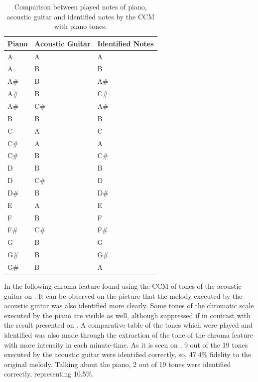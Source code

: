 \documentclass{article}
\begin{document}
	\begin{table}[h!]
	 \begin{center}
	 \begin{tabular}{|l|l|l|}
	  \hline
	  Piano & Acoustic Guitar & Identified Notes \\
	  \hline
		A	& A	& A \\
		A	&    B	&    B \\
		A\#	&    B	&    A\# \\
		A\#	&    B	&    C\# \\
		A\#	&    C\#	&    A\# \\
		B	&    B	&    B \\
		C	&    A	&    C \\
		C\#	&    A	&    A \\
		C\#	&    B	&    C\# \\
		D	&    B	&    B \\
		D	&    C\#	&    D \\
		D\#	&    B	&    D\# \\
		E	&    A	&    E \\
		F	&    B	&    F \\
		F\#	&    C\#	&    F\# \\
		G	&    B	&    G \\
		G\#	&    B	&    G\# \\
		G\#	&    B	&    A \\
	  \hline
	 \end{tabular}
	\end{center}
	 \caption{Comparison between played notes of piano, acoustic guitar and identified notes by the CCM with piano tones.}
	 \label{tab:table-2-ccm-piano}
	\end{table}


In the following chroma feature found using the CCM of tones of the acoustic guitar on . It can be observed on the picture that the melody executed by the acoustic guitar was also identified more clearly. Some tones of the chromatic scale executed by the piano are visible as well, although suppressed if in contrast with the result presented on . A comparative table of the tones which were played and identified was also made through the extraction of the tone of the chroma feature with more intensity in each minute-time. As it is seen on , 9 out of the 19 tones executed by the acoustic guitar were identified correctly, so, 47.4\% fidelity to the original melody. Talking about the piano, 2 out of 19 tones were identified correctly, representing 10.5\%. 
	
\end{document}
